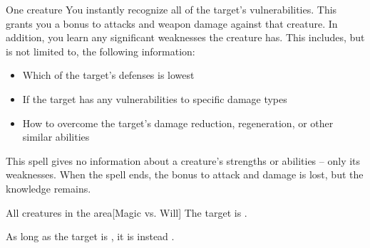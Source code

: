\begin{spellheader}
    \spellrng{\rngmed}
    \spelldur{\durshort}
\end{spellheader}
\begin{spelleffects}
    \begin{spelltarget}{One creature}
        \spelleffect You instantly recognize all of the target's vulnerabilities. This grants you a  bonus to attacks and weapon damage against that creature. In addition, you learn any significant weaknesses the creature has. This includes, but is not limited to, the following information:
        \begin{itemize}
            \item Which of the target's defenses is lowest
            \item If the target has any vulnerabilities to specific damage types
            \item How to overcome the target's damage reduction, regeneration, or other similar abilities
        \end{itemize}
    \end{spelltarget}
\end{spelleffects}
\begin{spellfooter}
    \spellnotes This spell gives no information about a creature's strengths or abilities -- only its weaknesses. When the spell ends, the bonus to attack and damage is lost, but the knowledge remains.
\end{spellfooter}

\begin{spellheader}
\end{spellheader}
\begin{spelleffects}
    \begin{spelltarget}{All creatures in the area}[Magic vs. Will]
        \spellsuccess The target is \bewildered.

        As long as the target is \bloodied, it is instead \confused.
    \end{spelltarget}
\end{spelleffects}
\begin{spellfooter}
    
\end{spellfooter}

